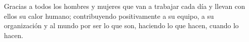 
\newpage

\hspace{1cm}\newline %
\vspace{5cm} %

\begin{center}
Gracias a todos los hombres y mujeres que van a trabajar cada día y llevan con ellos su calor humano; contribuyendo positivamente a su equipo, a su organización y al mundo por ser lo que son, haciendo lo que hacen, cuando lo hacen.
\end{center}

\newpage


